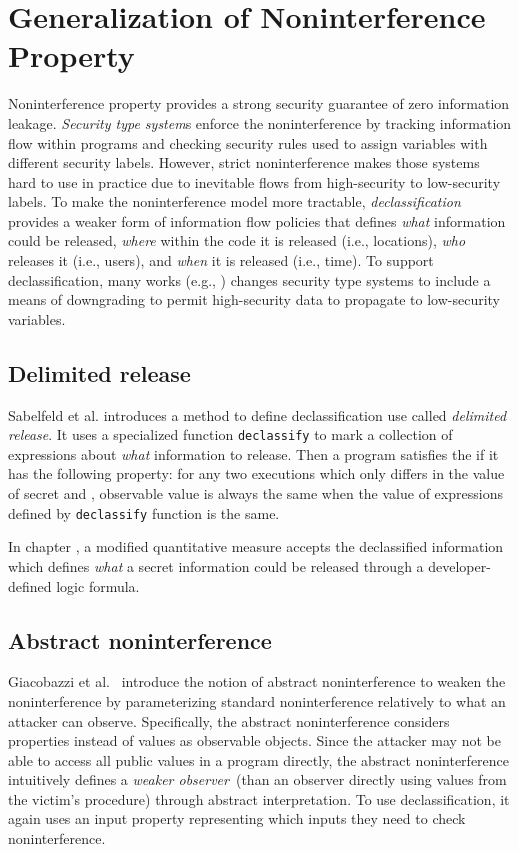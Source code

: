 \section{Generalization of Noninterference Property}
Noninterference property provides a strong security guarantee of zero
information leakage.  \textit{Security type system}s enforce the
noninterference by tracking information flow within programs and
checking security rules used to assign variables with different
security labels.  However, strict noninterference makes those systems
hard to use in practice due to inevitable flows from high-security to
low-security labels. To make the noninterference model more tractable,
\textit{declassification} \cite{Sabelfeld:2009:DDP:1662658.1662659}
provides a weaker form of information flow policies that defines
\textit{what} information could be released, \textit{where} within the
code it is released (i.e., locations), \textit{who} releases it (i.e.,
users), and \textit{when} it is released (i.e., time). To support
declassification, many works (e.g.,
\cite{sabelfeld2003model,giacobazzi2018abstract,chong2004security,
banerjee2008expressive,ferraiuolo2017verification}) changes security
type systems to include a means of downgrading to permit high-security
data to propagate to low-security variables. 

\subsection{Delimited release}
Sabelfeld et al. \cite{sabelfeld2003model} introduces a method to
define declassification use called \textit{delimited release}. It
uses a specialized function \texttt{declassify} to mark a collection
of expressions about \textit{what} information to release. Then a
program satisfies the  if it has the following
property:  for any two executions which only differs in the value of
secret \SecFn{} and \SecFnAlt{}, observable value is always the same
when the value of expressions defined by \texttt{declassify} function
is the same.

In chapter , a modified quantitative
measure accepts the declassified information which defines
\textit{what} a secret information could be released through a
developer-defined logic formula. 

\subsection{Abstract noninterference}
Giacobazzi et al.~\cite{giacobazzi2004abstract,giacobazzi2018abstract}
introduce the notion of abstract noninterference to weaken the
noninterference by parameterizing standard noninterference relatively
to what an attacker can observe.  Specifically, the abstract
noninterference considers properties instead of values as observable
objects. Since the attacker may not be able to access all public
values in a program directly, the abstract noninterference intuitively
defines a \textit{weaker observer}~(than an observer directly using
values from the victim's procedure) through abstract interpretation.
To use declassification, it again uses an input property representing
which inputs they need to check noninterference.    

